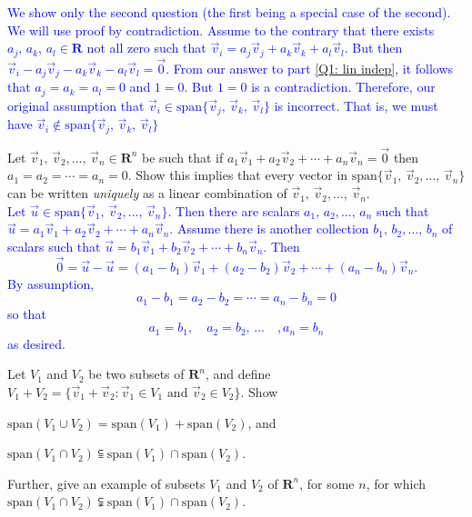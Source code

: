 \documentclass[a4paper,11pt]{article}
\newcommand{\R}{\mathbf{R}}
\newcommand{\BB}[1]{\textcolor{blue}{#1}}
\begin{document}
\begin{enumerate}[(a)]
  \BB{We show only the second question (the first being a special case of the
    second). We will use proof by contradiction. Assume to the contrary that
    there exists $a_j,\,a_k,\,a_l \in \R$ not all zero such that $\vec v_i
    = a_j\vec v_j + a_k\vec v_k + a_l\vec v_l$. But then $\vec v_i - a_j\vec v_j
    - a_k\vec v_k - a_l\vec v_l = \vec 0$. From our answer to part \ref{Q1: lin
      indep}, it follows that $a_j=a_k=a_l=0$ and $1=0$. But $1=0$ is a
    contradiction. Therefore, our original assumption that $\vec v_i \in
    \text{span}\{\vec v_j,\,\vec v_k,\,\vec v_l\}$ is incorrect. That is, we
    must have $\vec v_i \notin \text{span}\{\vec v_j,\,\vec v_k,\,\vec v_l\}$ \\}
\end{enumerate}

 Let $\vec v_1,\,\vec v_2,\dots,\,\vec v_n \in
\R^n$ be such that if $a_1\vec v_1 + a_2\vec v_2 + \cdots + a_n\vec v_n=\vec 0$
then $a_1=a_2=\cdots=a_n=0$. Show this implies that every vector in
$\text{span}\{\vec v_1,\,\vec v_2,\dots,\,\vec v_n\}$ can be written {\it
  uniquely} as a linear combination of $\vec v_1,\,\vec v_2,\dots,\,\vec v_n$. \\

\BB{Let $\vec u \in \text{span}\{\vec v_1,\,\vec v_2,\dots,\,\vec v_n\}$. Then
there are scalars $a_1,\,a_2,\dots,\,a_n$ such that $\vec u = a_1\vec v_1 +
a_2\vec v_2 + \cdots + a_n\vec v_n$. Assume there is another collection
$b_1,\,b_2,\dots,\,b_n$ of scalars such that $\vec u = b_1\vec v_1 + b_2\vec v_2
+ \cdots + b_n\vec v_n$. Then
\[
  \vec 0 = \vec u - \vec u =
  (a_1-b_1)\vec v_1 + (a_2-b_2)\vec v_2 + \cdots + (a_n-b_n)\vec v_n.
\]
By assumption,
\[
  a_1-b_1 = a_2-b_2 = \cdots = a_n-b_n = 0
\]
so that
\[
  a_1 = b_1, \quad a_2 = b_2,\, \dots\quad, a_n = b_n
\] as desired. \\}

 Let $V_1$ and $V_2$ be two subsets of $\R^n$, and
define $V_1+V_2=\{\vec v_1 + \vec v_2 : \vec v_1 \in V_1 \text{ and } \vec v_2
\in V_2 \}$. Show
\begin{enumerate*}[(a)]
\item $\text{span}(V_1 \cup V_2) = \text{span}(V_1) + \text{span}(V_2)$, and
\item $\text{span}(V_1 \cap V_2) \subseteqq \text{span}(V_1) \cap
  \text{span}(V_2)$.
\end{enumerate*}
Further, give an example of subsets $V_1$ and $V_2$ of $\R^n$, for some $n$, for
which $\text{span}(V_1 \cap V_2) \subsetneqq \text{span}(V_1) \cap
\text{span}(V_2)$. \\
\end{document}
